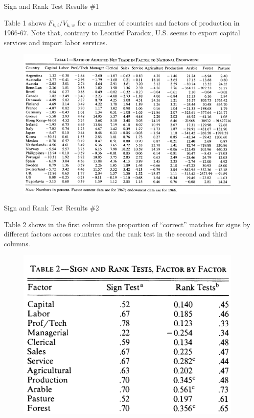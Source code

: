 \documentclass[aspectratio=169]{beamer}
\begin{document}

\begin{frame}{Sign and Rank Test Results \#1}

Table 1 shows $ F_{k,i} / V_{k,w} $ for a number of countries and factors of production in 1966-67.  Note that, contrary to Leontief Paradox, U.S. seems to export capital services and import labor services.

\begin{figure}
    \centering
    \includegraphics[scale = 0.57]{Table 1.png}
    \label{fig:Table1}
\end{figure}
    
\end{frame}


\begin{frame}{Sign and Rank Test Results \#2}

Table 2 shows in the first column the proportion of ``correct” matches for signs by different factors across countries and the rank test in the second and third columns.

\begin{figure}
    \centering
    \includegraphics[scale = 1.1]{Table 2.png}
    \label{fig:Table2}
\end{figure}
    
\end{frame}
\end{document}
